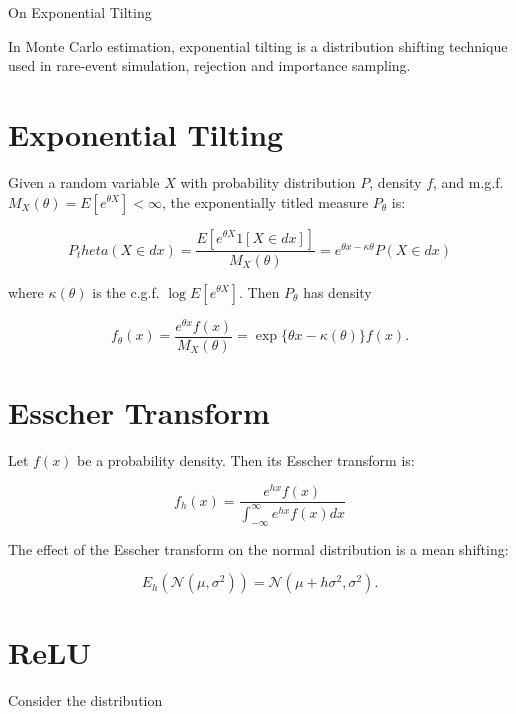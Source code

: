 \documentclass[11pt]{article}
\begin{document}
\begin{center}
{\huge On Exponential Tilting} 
\end{center}

In Monte Carlo estimation, exponential tilting is a distribution shifting technique used in rare-event simulation, rejection and importance sampling.

\section{Exponential Tilting}

Given a random variable $X$ with probability distribution $P$, density $f$, and m.g.f. $M_X(\theta) = E[e^{\theta X}] < \infty$, the exponentially titled measure $P_\theta$ is:

\begin{equation}
P_theta(X \in dx) = \frac{E[e^{\theta X}1[X\in dx]]}{M_X (\theta)} = e^{\theta x - \kappa{\theta}} P(X \in dx)
\end{equation}

where $\kappa(\theta)$ is the c.g.f. $\log E[e^{\theta X}]$. Then $P_\theta$ has density

\begin{equation}
f_\theta(x) = \frac{e^{\theta x}f(x)}{M_X(\theta)}=\exp\{\theta x - \kappa(\theta) \}f(x).
\end{equation}

\section{Esscher Transform}

Let $f(x)$ be a probability density. Then its Esscher transform is:

\begin{equation}
f_h(x) = \frac{ e^{hx}f(x) }{ \int_{-\infty}^{\infty} e^{hx}f(x)dx }
\end{equation}

The effect of the Esscher transform on the normal distribution is a mean shifting:

\begin{equation}
E_h(\mathcal{N}(\mu,\sigma^2)) = \mathcal{N}(\mu+h\sigma^2,\sigma^2).
\end{equation}

\section{ReLU}

Consider the distribution
\end{document}
